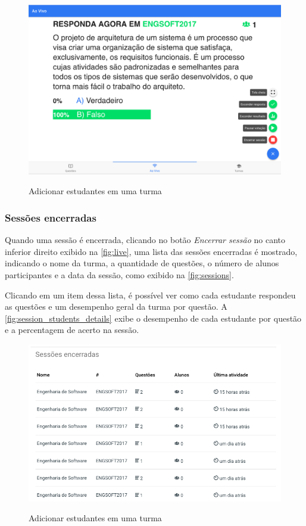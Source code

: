 \begin{figure}[ht]
  \centering
  \caption{Adicionar estudantes em uma turma}
  \includegraphics[scale=.4]{imagens/telas/live_answers}
  \doautor
  \label{fig:live_answers}
\end{figure}

\subsubsection{Sessões encerradas}

Quando uma sessão é encerrada, clicando no botão \textit{Encerrar sessão} no canto inferior direito
exibido na \autoref{fig:live}, uma lista das sessões encerradas é mostrado, indicando
o nome da turma, a quantidade de questões, o número de alunos participantes e a data da sessão, como
exibido na \autoref{fig:sessions}.

Clicando em um item dessa lista, é possível ver como cada estudante respondeu as questões e um
desempenho geral da turma por questão. A \autoref{fig:session_students_details}  exibe o
desempenho de cada estudante por questão e a percentagem de acerto na sessão.

\begin{figure}[ht]
  \centering
  \caption{Adicionar estudantes em uma turma}
  \includegraphics[scale=.4]{imagens/telas/sessions}
  \doautor
  \label{fig:sessions}
\end{figure}

